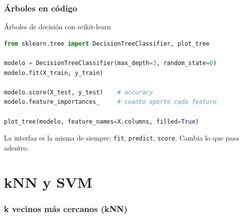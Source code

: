 \section{Árboles en código}

\begin{frame}[fragile]{Árboles de decisión con scikit-learn}
  \begin{lstlisting}[language=Python]
from sklearn.tree import DecisionTreeClassifier, plot_tree

modelo = DecisionTreeClassifier(max_depth=3, random_state=0)
modelo.fit(X_train, y_train)

modelo.score(X_test, y_test)    # accuracy
modelo.feature_importances_     # cuanto aporto cada feature

plot_tree(modelo, feature_names=X.columns, filled=True)
  \end{lstlisting}
  La interfaz es la misma de siempre: \texttt{fit}, \texttt{predict},
  \texttt{score}. Cambia lo que pasa adentro.
\end{frame}

\part{kNN y SVM}
\frame{\partpage}

\section{k vecinos más cercanos (kNN)}

